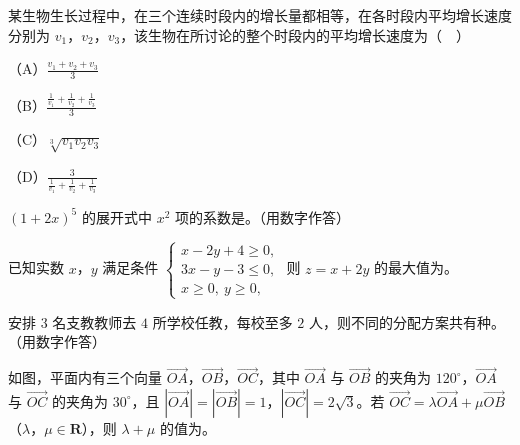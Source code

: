 \begin{question}
某生物生长过程中，在三个连续时段内的增长量都相等，在各时段内平均增长速度分别为 $v_1$，$v_2$，$v_3$，该生物在所讨论的整个时段内的平均增长速度为（　）

（A）$\frac{v_1+v_2+v_3}{3}$

（B）$\frac{\frac1{v_1}+\frac1{v_2}+\frac1{v_3}}{3}$

（C）$\sqrt[3]{v_1v_2v_3}$

（D）$\frac3{\frac1{v_1}+\frac1{v_2}+\frac1{v_3}}$

\end{question}

\begin{question}
$(1+2x)^5$ 的展开式中 $x^2$ 项的系数是\gkblank{}。（用数字作答）

\end{question}
\begin{question}
已知实数 $x$，$y$ 满足条件 $\begin{cases}x-2y+4\geqslant0,\\ 3x-y-3\leqslant0,\\ x\geqslant0,\ y\geqslant0,\end{cases}$ 则 $z=x+2y$ 的最大值为\gkblank{}。

\end{question}
\begin{question}
安排 $3$ 名支教教师去 $4$ 所学校任教，每校至多 $2$ 人，则不同的分配方案共有\gkblank{}种。（用数字作答）

\Needspace{0.4\textheight}
\end{question}
\begin{question}
如图，平面内有三个向量 $\overrightarrow{OA}$，$\overrightarrow{OB}$，$\overrightarrow{OC}$，其中 $\overrightarrow{OA}$ 与 $\overrightarrow{OB}$ 的夹角为 $120^\circ$，$\overrightarrow{OA}$ 与 $\overrightarrow{OC}$ 的夹角为 $30^\circ$，且 $|\overrightarrow{OA}|=|\overrightarrow{OB}|=1$，$|\overrightarrow{OC}|=2\sqrt3$。若 $\overrightarrow{OC}=\lambda\overrightarrow{OA}+\mu\overrightarrow{OB}$（$\lambda$，$\mu\in\mathbf R$），则 $\lambda+\mu$ 的值为\gkblank{}。
\nopagebreak[4]
\begin{center}\end{center}
\nopagebreak[4]
\end{question}

